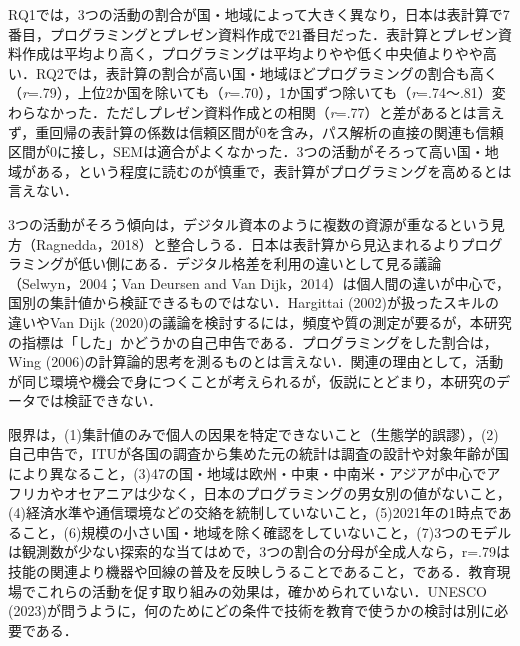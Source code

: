 \documentclass[a4paper,10pt,twocolumn]{ltjsarticle}
\makeatletter
\renewcommand{\section}{\@startsection{section}{1}{\z@}{1.1\Cvs \@plus.4\Cdp \@minus.2\Cdp}{.5\Cvs \@plus.2\Cdp}{\normalfont\gtfamily\bfseries\large}}
\makeatother
\begin{document}
\section{考察}
RQ1では，3つの活動の割合が国・地域によって大きく異なり，日本は表計算で7番目，プログラミングとプレゼン資料作成で21番目だった．表計算とプレゼン資料作成は平均より高く，プログラミングは平均よりやや低く中央値よりやや高い．RQ2では，表計算の割合が高い国・地域ほどプログラミングの割合も高く（\textit{r}=.79），上位2か国を除いても（\textit{r}=.70），1か国ずつ除いても（\textit{r}=.74〜.81）変わらなかった．ただしプレゼン資料作成との相関（\textit{r}=.77）と差があるとは言えず，重回帰の表計算の係数は信頼区間が0を含み，パス解析の直接の関連も信頼区間が0に接し，SEMは適合がよくなかった．3つの活動がそろって高い国・地域がある，という程度に読むのが慎重で，表計算がプログラミングを高めるとは言えない．

3つの活動がそろう傾向は，デジタル資本のように複数の資源が重なるという見方（Ragnedda，2018）と整合しうる．日本は表計算から見込まれるよりプログラミングが低い側にある．デジタル格差を利用の違いとして見る議論（Selwyn，2004；Van Deursen and Van Dijk，2014）は個人間の違いが中心で，国別の集計値から検証できるものではない．Hargittai (2002)が扱ったスキルの違いやVan Dijk (2020)の議論を検討するには，頻度や質の測定が要るが，本研究の指標は「した」かどうかの自己申告である．プログラミングをした割合は，Wing (2006)の計算論的思考を測るものとは言えない．関連の理由として，活動が同じ環境や機会で身につくことが考えられるが，仮説にとどまり，本研究のデータでは検証できない．

限界は，(1)集計値のみで個人の因果を特定できないこと（生態学的誤謬），(2)自己申告で，ITUが各国の調査から集めた元の統計は調査の設計や対象年齢が国により異なること，(3)47の国・地域は欧州・中東・中南米・アジアが中心でアフリカやオセアニアは少なく，日本のプログラミングの男女別の値がないこと，(4)経済水準や通信環境などの交絡を統制していないこと，(5)2021年の1時点であること，(6)規模の小さい国・地域を除く確認をしていないこと，(7)3つのモデルは観測数が少ない探索的な当てはめで，3つの割合の分母が全成人なら，r=.79は技能の関連より機器や回線の普及を反映しうることであること，である．教育現場でこれらの活動を促す取り組みの効果は，確かめられていない．UNESCO (2023)が問うように，何のためにどの条件で技術を教育で使うかの検討は別に必要である．
\end{document}
